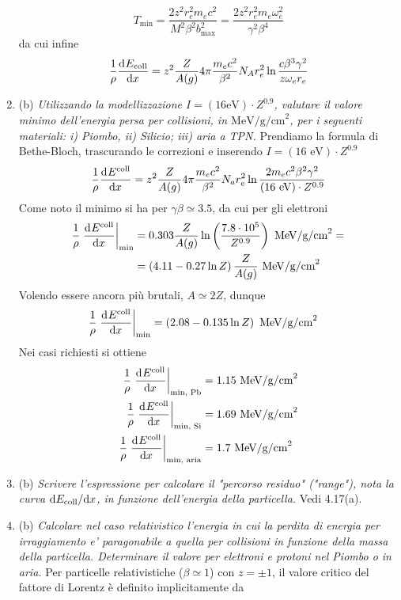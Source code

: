 \documentclass{article}
\renewcommand{\b}{(b)}
\renewcommand{\t}[1]{\textit{ #1}}
\begin{document}
\begin{enumerate}
\[T_\textrm{min}=\frac{2z^2r_e^2m_ec^2}{M^2\beta^2b_\textrm{max}^2}=\frac{2z^2r_e^2m_e\omega_e^2}{\gamma^2\beta^4}\]
da cui infine
\[\frac{1}{\rho}\dfrac{\mathrm{d} ^{}E_\mathrm{coll}}{\mathrm{d} {x}^{}}=z^2\frac{Z}{A(g)}4\pi\frac{m_ec^2}{\beta^2}N_Ar_e^2\ln\frac{c\beta^3\gamma^2}{z\omega_er_e}\]
	\item\b\t{Utilizzando la modellizzazione $I = (16\mathrm{eV})\cdot Z^{0.9}$, valutare il valore minimo
		dell’energia persa per collisioni, in $\mathrm{MeV/g/cm}^2$, per i seguenti materiali: i)
		Piombo, ii) Silicio; iii) aria a TPN.}
	Prendiamo la formula di Bethe-Bloch, trascurando le correzioni e inserendo $I=(16\textrm{ eV})\cdot Z^{0.9}$
	\[\frac{1}{\rho}\dfrac{\mathrm{d} ^{}E^\mathrm{coll}}{\mathrm{d} {x}^{}} = z^2\frac{Z}{A(g)}4\pi\frac{m_ec^2}{\beta^2}N_ar_e^2\ln\frac{2m_ec^2\beta^2\gamma^2}{(16\textrm{ eV})\cdot Z^{0.9}}\]
	Come noto il minimo si ha per $\gamma\beta\simeq 3.5$, da cui per gli elettroni
	\begin{align*}\frac{1}{\rho}\left.\dfrac{\mathrm{d} ^{}E^\textrm{coll}}{\mathrm{d} {x}^{}}\right|_{\textrm{min}}&=0.303\frac{Z}{A(g)}\ln\left(\frac{7.8\cdot 10^{5}}{Z^{0.9
	}}\right)\textrm{ MeV/g/cm}^2=\\&=\left(4.11-0.27\ln Z\right)\frac{Z}{A(g)}\textrm{ MeV/g/cm}^2\end{align*}
	Volendo essere ancora più brutali, $A\simeq 2Z$, dunque
	\begin{align*}\frac{1}{\rho}\left.\dfrac{\mathrm{d} ^{}E^\textrm{coll}}{\mathrm{d} {x}^{}}\right|_{\textrm{min}}&=\left(2.08-0.135\ln Z\right)\textrm{ MeV/g/cm}^2\end{align*}
	Nei casi richiesti si ottiene
	\begin{align*}
		\frac{1}{\rho}\left.\dfrac{\mathrm{d} ^{}E^\textrm{coll}}{\mathrm{d} {x}^{}}\right|_{\textrm{min, Pb}}&=1.15\textrm{ MeV/g/cm}^2\\
		\frac{1}{\rho}\left.\dfrac{\mathrm{d} ^{}E^\textrm{coll}}{\mathrm{d} {x}^{}}\right|_{\textrm{min, Si}}&=1.69\textrm{ MeV/g/cm}^2\\
		\frac{1}{\rho}\left.\dfrac{\mathrm{d} ^{}E^\textrm{coll}}{\mathrm{d} {x}^{}}\right|_{\textrm{min, aria}}&=1.7\textrm{ MeV/g/cm}^2
	\end{align*}
	\item\b\t{Scrivere l'espressione per calcolare il "percorso residuo" ("range"), nota la curva
		$\mathrm{d} E_\mathrm{coll}/\mathrm{d} x$, in funzione dell'energia della particella.} Vedi 4.17(a).
	\item\b\t{Calcolare nel caso relativistico l’energia in cui la perdita di energia per
		irraggiamento e’ paragonabile a quella per collisioni in funzione della massa della
		particella. Determinare il valore per elettroni e protoni nel Piombo o in aria.}
	Per particelle relativistiche ($\beta\simeq1$) con $z=\pm1$, il valore critico del fattore di Lorentz è definito implicitamente da

\end{enumerate}
\end{document}
